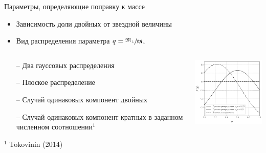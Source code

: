 \documentclass[pdf]{beamer}
\begin{document}
	\begin{frame}{Параметры, определяющие поправку к массе}
		\begin{itemize}
			\item Зависимость доли двойных от звездной величины
			\item Вид распределения параметра $ q = \sfrac{\mathfrak{M_2}}{\mathfrak{M_1}} $
		\end{itemize}
		\pause

		\begin{columns}
			\begin{column}{0.5\textwidth}
			\begin{itemize}
				\item[--] Два гауссовых распределения
				\item[--] Плоское распределение
				\item[--] Случай одинаковых компонент двойных
				\item[--] Случай одинаковых компонент кратных в  заданном численном соотношении$^1$
				
			\end{itemize}	
			\hspace{0.2cm}	
			{\footnotesize $^1$ Tokovinin (2014)}
			\end{column}
			
			\begin{column}{0.45\textwidth}
				
				\includegraphics[width=5cm]{images/q_dists.pdf}
			\end{column}
		\end{columns}
		\vspace{-0.5cm}

	\end{frame}
	
\end{document}
